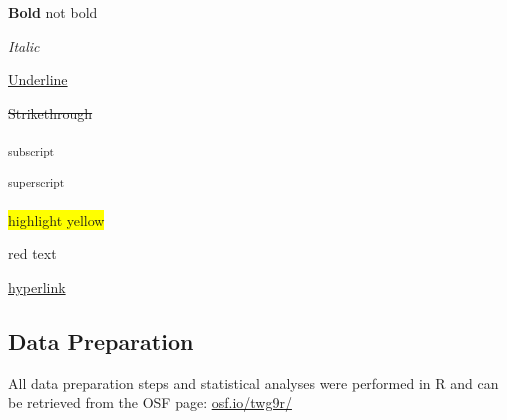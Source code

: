 \documentclass{article}
\begin{document}
	\textbf{Bold }not bold



	\emph{Italic}



	\underline{Underline}



	\sout{Strikethrough}



	\textsubscript{subscript}



	\textsuperscript{superscript}



	\colorbox{yellow}{highlight yellow}



	{\color[HTML]{FF0000}red text}










	\href{https://hyperlink.com/}{hyperlink}







	\subsection{Data Preparation}



	All data preparation steps and statistical analyses were performed in R \parencites{RCoreTeam2019} and can be retrieved from the OSF page: \href{https://osf.io/twg9r/}{osf.io/twg9r/}
\end{document}
